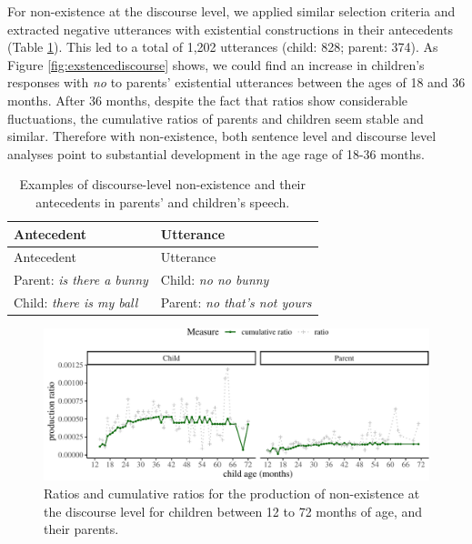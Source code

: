 \documentclass[
  english,
  man,floatsintext]{apa6}
\begin{document}
For non-existence at the discourse level, we applied similar selection criteria and extracted negative utterances with existential constructions in their antecedents (Table \ref{tab:disexist}). This led to a total of 1,202 utterances (child: 828; parent: 374). As Figure \ref{fig:exstencediscourse} shows, we could find an increase in children's responses with \emph{no} to parents' existential utterances between the ages of 18 and 36 months. After 36 months, despite the fact that ratios show considerable fluctuations, the cumulative ratios of parents and children seem stable and similar. Therefore with non-existence, both sentence level and discourse level analyses point to substantial development in the age rage of 18-36 months.

\begin{longtable}[]{@{}ll@{}}
\caption{\label{tab:disexist} Examples of discourse-level non-existence and their antecedents in parents' and children's speech.}\tabularnewline
\toprule
Antecedent & Utterance \\
\midrule
\endfirsthead
\toprule
Antecedent & Utterance \\
\midrule
\endhead
Parent: \emph{is there a bunny} & Child: \emph{no no bunny} \\
Child: \emph{there is my ball} & Parent: \emph{no that's not yours} \\
\bottomrule
\end{longtable}

\begin{figure}[H]

{\centering \includegraphics{neg_construction_article_files/figure-latex/existencediscourse-1} 

}

\caption{Ratios and cumulative ratios for the production of non-existence at the discourse level for children between 12 to 72 months of age, and their parents.}\label{fig:existencediscourse}
\end{figure}
\end{document}
